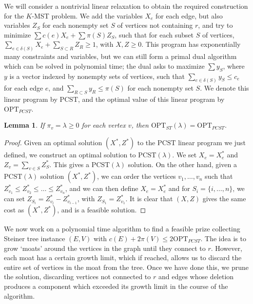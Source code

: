 \documentclass{article}
\theoremstyle{plain}
\newtheorem{lemma}{Lemma}
\theoremstyle{plain}
\begin{document}
We will consider a nontrivial linear relaxation to obtain the required construction for the $K$-MST problem. We add the variables $X_e$ for each edge, but also variables $Z_S$ for each nonempty set $S$ of vertices not containing $r$, and try to minimize $\sum c(e) X_e + \sum \pi(S) Z_S$, such that for each subset $S$ of vertices, $\sum_{e \in \delta(S)} X_e + \sum_{S \subset R} Z_R \geq 1$, with $X,Z \geq 0$. This program has exponentially many constraints and variables, but we can still form a primal dual algorithm which can be solved in polynomial time; the dual asks to maximize $\sum y_S$, where $y$ is a vector indexed by nonempty sets of vertices, such that $\sum_{e \in \delta(S)} y_S \leq c_e$ for each edge $e$, and $\sum_{R \subset S} y_R \leq \pi(S)$ for each nonempty set $S$. We denote this linear program by $\text{PCST}$, and the optimal value of this linear program by $\text{OPT}_{PCST}$.

\begin{lemma}
    If $\pi_v = \lambda \geq 0$ for each vertex $v$, then $\text{OPT}_{ST}(\lambda) = \text{OPT}_{PCST}$.
\end{lemma}
\begin{proof}
    Given an optimal solution $(X^*,Z^*)$ to the $\text{PCST}$ linear program we just defined, we construct an optimal solution to  $\text{PCST}(\lambda)$. We set $X_e = X^*_e$ and $Z_v = \sum_{v \in S} Z^*_S$. This gives a $\text{PCST}(\lambda)$ solution. On the other hand, given a $\text{PCST}(\lambda)$ solution $(X^*,Z^*)$, we can order the vertices $v_1, \dots, v_n$ such that $Z^*_{v_1} \leq Z^*_{v_2} \leq \dots \leq Z^*_{v_n}$, and we can then define $X_e = X^*_e$ and for $S_i = \{ i, \dots, n \}$, we can set $Z_{S_i} = Z^*_{v_i} - Z^*_{v_{i-1}}$, with $Z_{S_1} = Z^*_{v_1}$. It is clear that $(X,Z)$ gives the same cost as $(X^*,Z^*)$, and is a feasible solution.
\end{proof}

We now work on a polynomial time algorithm to find a feasible prize collecting Steiner tree instance $(E,V)$ with $c(E) + 2 \pi(V) \leq 2 \text{OPT}_{PCST}$. The idea is to grow `moats' around the vertices in the graph until they connect to $r$. However, each moat has a certain growth limit, which if reached, allows us to discard the entire set of vertices in the moat from the tree. Once we have done this, we prune the solution, discarding vertices not connected to $r$ and edges whose deletion produces a component which exceeded its growth limit in the course of the algorithm.
\end{document}
